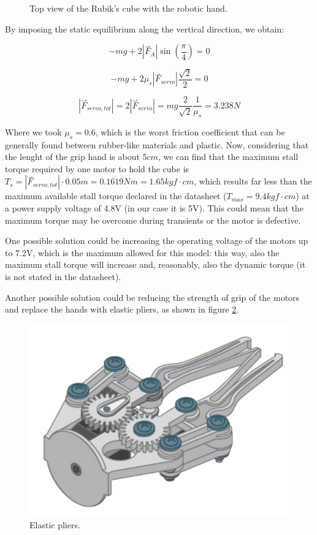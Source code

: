 \documentclass{report}
\begin{document}
\begin{itemize}
    \begin{figure}[h]
        \centering
        
        \caption{Top view of the Rubik's cube with the robotic hand.}
        \label{fig:cube-friction}
    \end{figure}

    By imposing the static equilibrium along the vertical direction, we obtain:

    \begin{equation}\label{eq:static1}
        -mg+2|\overset{\rightharpoonup}{F}_A|\sin{(\frac{\pi}{4})}=0
    \end{equation}

    \begin{equation}\label{eq:static2}
        -mg+2\mu_s|\overset{\rightharpoonup}{F}_{servo}|\frac{\sqrt{2}}{2}=0
    \end{equation}

    \begin{equation}\label{eq:static3}
        |\overset{\rightharpoonup}{F}_{servo,tot}|=2|\overset{\rightharpoonup}{F}_{servo}|=mg\frac{2}{\sqrt{2}}\frac{1}{\mu_s}=3.238N
    \end{equation}

    Where we took \(\mu_s=0.6\), which is the worst friction coefficient that can be generally found between rubber-like materials and plastic. Now, considering that the lenght of the grip hand is about \(5cm\), we can find that the maximum stall torque required by one motor to hold the cube is \(T_s= |\overset{\rightharpoonup}{F}_{servo,tot}|\cdot0.05m=0.1619Nm=1.65kgf\cdot cm\), which results far less than the maximum available stall torque declared in the datasheet (\(T_{max}=9.4kgf\cdot cm\)) at a power supply voltage of 4.8V (in our case it is 5V). This could mean that the maximum torque may be overcome during transients or the motor is defective.

    \bigskip

    One possible solution could be increasing the operating voltage of the motors up to 7.2V, which is the maximum allowed for this model: this way, also the maximum stall torque will increase and, reasonably, also the dynamic torque (it is not stated in the datasheet).

    Another possible solution could be reducing the strength of grip of the motors and replace the hands with elastic pliers, as shown in figure \ref{fig:elastic-pliers}.

    \begin{figure}[h]
        \centering
        \includegraphics[width=0.5\linewidth]{images/problems/pliers.PNG}
        \caption{Elastic pliers.}
        \label{fig:elastic-pliers}
    \end{figure}


\end{itemize}
\end{document}
